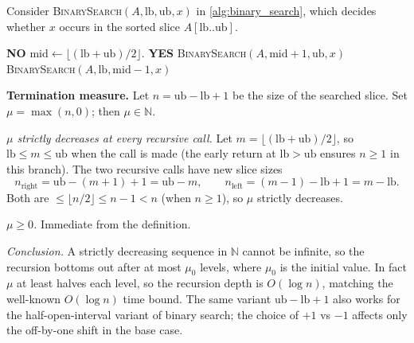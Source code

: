 \begin{example}
\label{ex:binary_search_termination}
Consider \textsc{BinarySearch}$(A, \mathrm{lb}, \mathrm{ub}, x)$ in \cref{alg:binary_search}, which decides whether $x$ occurs in the sorted slice $A[\mathrm{lb}..\mathrm{ub}]$.

\begin{algorithm}
\caption{\textsc{BinarySearch}$(A, \mathrm{lb}, \mathrm{ub}, x)$.}
\label{alg:binary_search}
\begin{algorithmic}[1]
   \Return \textbf{NO} \EndIf
  \State $\mathrm{mid} \gets \lfloor (\mathrm{lb} + \mathrm{ub})/2 \rfloor$.
   \Return \textbf{YES}
   \Return \textsc{BinarySearch}$(A, \mathrm{mid}+1, \mathrm{ub}, x)$
   \Return \textsc{BinarySearch}$(A, \mathrm{lb}, \mathrm{mid}-1, x)$
  \EndIf
\end{algorithmic}
\end{algorithm}

\noindent\textbf{Termination measure.} Let $n = \mathrm{ub} - \mathrm{lb} + 1$ be the size of the searched slice. Set $\mu = \max(n, 0)$; then $\mu \in \mathbb{N}$.

\medskip
\noindent\textit{$\mu$ strictly decreases at every recursive call.} Let $m = \lfloor (\mathrm{lb} + \mathrm{ub})/2 \rfloor$, so $\mathrm{lb} \le m \le \mathrm{ub}$ when the call is made (the early return at $\mathrm{lb} > \mathrm{ub}$ ensures $n \ge 1$ in this branch). The two recursive calls have new slice sizes
\[
  n_{\text{right}} = \mathrm{ub} - (m + 1) + 1 = \mathrm{ub} - m, \qquad
  n_{\text{left}}  = (m - 1) - \mathrm{lb} + 1 = m - \mathrm{lb}.
\]
Both are $\le \lfloor n/2 \rfloor \le n - 1 < n$ (when $n \ge 1$), so $\mu$ strictly decreases.

\medskip
\noindent\textit{$\mu \ge 0$.} Immediate from the definition.

\medskip
\noindent\textit{Conclusion.} A strictly decreasing sequence in $\mathbb{N}$ cannot be infinite, so the recursion bottoms out after at most $\mu_0$ levels, where $\mu_0$ is the initial value. In fact $\mu$ at least halves each level, so the recursion depth is $O(\log n)$, matching the well-known $O(\log n)$ time bound. The same variant $\mathrm{ub} - \mathrm{lb} + 1$ also works for the half-open-interval variant of binary search; the choice of $+1$ vs $-1$ affects only the off-by-one shift in the base case.
\end{example}

